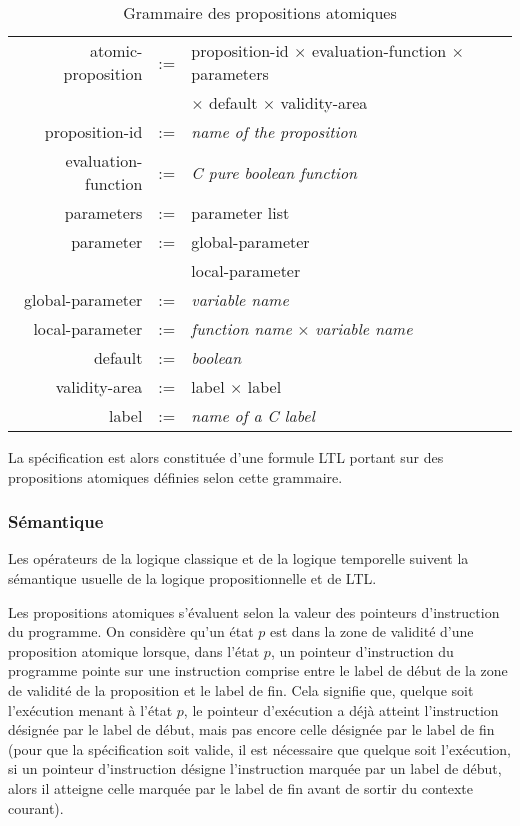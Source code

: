\begin{table}[h]
\centering
\caption{Grammaire des propositions atomiques}
\label{tab:spe_gram}
\begin{tabular}[]{@{}rcl@{}}
\hline
atomic-proposition  & := & proposition-id \(\times\) evaluation-function \(\times\) parameters\\
                    &    & \(\times\) default \(\times\) validity-area\\
proposition-id      & := & \emph{name of the proposition}\\
evaluation-function & := & \emph{C pure boolean function}\\
parameters          & := & parameter list\\
parameter           & := & global-parameter\\
                    & \textbar{} & local-parameter\\
global-parameter    & := & \emph{variable name}\\
local-parameter     & := & \emph{function name} \(\times\) \emph{variable name}\\
default             & := & \emph{boolean}\\
validity-area       & := & label \(\times\) label\\
label               & := & \emph{name of a C label}\\
\hline
\end{tabular}
\end{table}

La spécification est alors constituée d'une formule LTL portant sur des
propositions atomiques définies selon cette grammaire.

\subsubsection{Sémantique}

Les opérateurs de la logique classique et de la logique temporelle
suivent la sémantique usuelle de la logique propositionnelle et de LTL.

Les propositions atomiques s'évaluent selon la valeur des pointeurs
d'instruction du programme. On considère qu'un état \(p\) est dans la zone de
validité d'une proposition atomique lorsque, dans l'état \(p\), un pointeur
d'instruction du programme pointe sur une instruction comprise entre le label de
début de la zone de validité de la proposition et le label de fin. Cela signifie
que, quelque soit l'exécution menant à l'état \(p\), le pointeur d'exécution a
déjà atteint l'instruction désignée par le label de début, mais pas encore celle
désignée par le label de fin (pour que la spécification soit valide, il est
nécessaire que quelque soit l'exécution, si un pointeur d'instruction désigne
l'instruction marquée par un label de début, alors il atteigne celle marquée par
le label de fin avant de sortir du contexte courant).

